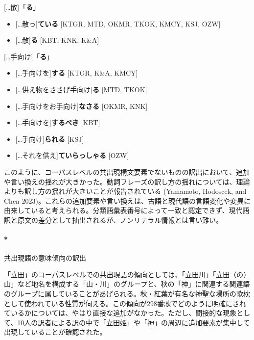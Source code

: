 \documentclass[
  letterpaper,
  DIV=11,
  numbers=noendperiod]{scrartcl}
\let\oldparagraph\paragraph
\renewcommand{\paragraph}[1]{\oldparagraph{#1}\mbox{}}
\providecommand{\tightlist}{%
  \setlength{\itemsep}{0pt}\setlength{\parskip}{0pt}}\usepackage{longtable,booktabs,array}
\begin{document}
{[}\ldots 散{]}「\textbf{る}」

\begin{itemize}
\tightlist
\item
  {[}\ldots 散っ{]}\textbf{ている} {[}KTGR, MTD, OKMR, TKOK, KMCY, KSJ,
  OZW{]}
\item
  {[}\ldots 散{]}\textbf{る} {[}KBT, KNK, K\&A{]}
\end{itemize}

{[}\ldots 手向け{]}「\textbf{る}」

\begin{itemize}
\tightlist
\item
  {[}\ldots 手向けを{]}\textbf{する} {[}KTGR, K\&A, KMCY{]}
\item
  {[}\ldots 供え物をささげ\textbar 手向け{]}\textbf{る} {[}MTD, TKOK{]}
\item
  {[}\ldots 手向けを\textbar お手向け{]}\textbf{なさる} {[}OKMR, KNK{]}
\item
  {[}\ldots 手向けを{]}\textbf{するべき} {[}KBT{]}
\item
  {[}\ldots 手向け{]}\textbf{られる} {[}KSJ{]}
\item
  {[}\ldots それを供え{]}\textbf{ていらっしゃる} {[}OZW{]}
\end{itemize}

このように、コーパスレベルの共出現構文要素でないものの訳出において、追加や言い換えの揺れが大きかった。動詞フレーズの訳し方の揺れについては、理論よりも訳し方の揺れが大きいことが報告されている
(Yamamoto, Hodoscek, and Chen
2023)。これらの追加要素や言い換えは、古語と現代語の言語変化や変異に由来していると考えられる。分類語彙表番号によって一致と認定できず、現代語訳と原文の差分として抽出されるが、ノンリテラル情報とは言い難い。

\paragraph*{共出現語の意味傾向の訳出}\label{ux5171ux51faux73feux8a9eux306eux610fux5473ux50beux5411ux306eux8a33ux51fa}

「立田」のコーパスレベルでの共出現語の傾向としては、「立田川」「立田（の）山」など地名を構成する「山・川」のグループと、秋の「神」に関連する関連語のグループに属していることがあげられる。秋・紅葉が有名な神聖な場所の歌枕として使われている性質が伺える。この傾向が298番歌でどのように明確にされているかについては、やはり直接な追加がなかった。ただし、間接的な現象として、10人の訳者による訳の中で「立田姫」や「神」の周辺に追加要素が集中して出現していることが確認された。
\end{document}
